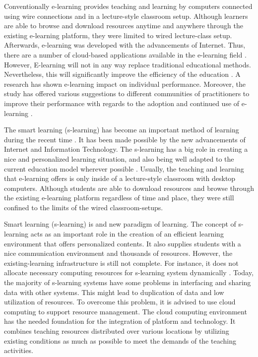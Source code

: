 \documentclass[journal]{vgtc}
\begin{document}
Conventionally e-learning provides teaching and learning by computers connected using wire connections and in a lecture-style classroom setup. Although learners are able to browse and download resources anytime and anywhere through the existing e-learning platform, they were limited to wired lecture-class setup. Afterwards, e-learning was developed with the advancements of Internet. Thus, there are a number of cloud-based applications available in the e-learning field \cite{s110807835}. However, E-learning will not in any way replace traditional educational methods. Nevertheless, this will significantly improve the efficiency of the education \cite{SudhirKumarSharmaNidhiGoyal2014}. A research has shown e-learning impact on individual performance. Moreover, the study has offered various suggestions to different communities of practitioners to improve their performance with regards to the adoption and continued use of e-learning \cite{Mohammadyari2014}.

The smart learning (s-learning) has become an important method of learning during the recent time \cite{Kim2013}. It has been made possible by the new advancements of Internet and Information Technology. The s-learning has a big role in creating a nice and personalized learning situation, and also being well adapted to the current education model wherever possible \cite{Uden2007}. Usually, the teaching and learning that e-learning offers is only inside of a lecture-style classroom with desktop computers. Although students are able to download resources and browse through the existing e-learning platform regardless of time and place, they were still confined to the limits of the wired classroom-setups.

Smart learning (s-learning) is and new paradigm of learning. The concept of s-learning acts as an important role in the creation of an efficient learning environment that offers personalized contents. It also supplies students with a nice communication environment and thousands of resources. However, the existing-learning infrastructure is still not complete. For instance, it does not allocate necessary computing resources for s-learning system dynamically \cite{Uden2007}. Today, the majority of s-learning systems have some problems in interfacing and sharing data with other systems. This might lead to duplication of data and low utilization of resources. To overcome this problem, it is advised to use cloud computing to support resource management. The cloud computing environment has the needed foundation for the integration of platform and technology. It combines teaching resources distributed over various locations by utilizing existing conditions as much as possible to meet the demands of the teaching activities.
\end{document}
